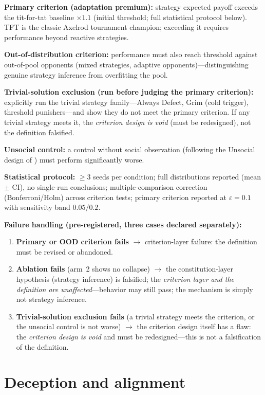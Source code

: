 \documentclass[11pt]{article}
\begin{document}
\textbf{Primary criterion (adaptation premium):} strategy expected payoff exceeds the tit-for-tat baseline $\times 1.1$ (initial threshold; full statistical protocol below). TFT is the classic Axelrod tournament champion; exceeding it requires performance beyond reactive strategies.

\textbf{Out-of-distribution criterion:} performance must also reach threshold against out-of-pool opponents (mixed strategies, adaptive opponents)---distinguishing genuine strategy inference from overfitting the pool.

\textbf{Trivial-solution exclusion (run before judging the primary criterion):} explicitly run the trivial strategy family---Always Defect, Grim (cold trigger), threshold punishers---and show they do not meet the primary criterion. If any trivial strategy meets it, the \emph{criterion design is void} (must be redesigned), not the definition falsified.

\textbf{Unsocial control:} a control without social observation (following the Unsocial design of \cite{kovac2021}) must perform significantly worse.

\textbf{Statistical protocol:} $\geq 3$ seeds per condition; full distributions reported (mean $\pm$ CI), no single-run conclusions; multiple-comparison correction (Bonferroni/Holm) across criterion tests; primary criterion reported at $\varepsilon = 0.1$ with sensitivity band $0.05/0.2$.

\textbf{Failure handling (pre-registered, three cases declared separately):}

\begin{enumerate}
\item \textbf{Primary or OOD criterion fails} $\rightarrow$ criterion-layer failure: the definition must be revised or abandoned.
\item \textbf{Ablation fails} (arm~2 shows no collapse) $\rightarrow$ the constitution-layer hypothesis (strategy inference) is falsified; the \emph{criterion layer and the definition are unaffected}---behavior may still pass; the mechanism is simply not strategy inference.
\item \textbf{Trivial-solution exclusion fails} (a trivial strategy meets the criterion, or the unsocial control is not worse) $\rightarrow$ the criterion design itself has a flaw: the \emph{criterion design is void} and must be redesigned---this is not a falsification of the definition.
\end{enumerate}

\section{Deception and alignment}
\label{sec:deception}
\end{document}
